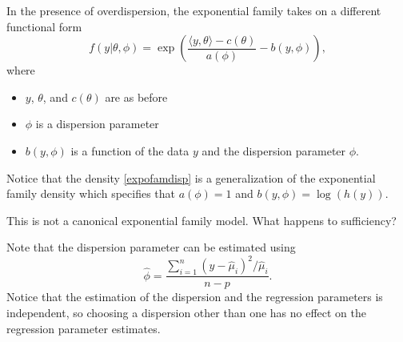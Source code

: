 \documentclass[
  ignorenonframetext,
]{beamer}
\providecommand{\tightlist}{%
  \setlength{\itemsep}{0pt}\setlength{\parskip}{0pt}}
\begin{document}
\begin{frame}{}
\protect\hypertarget{section}{}
In the presence of overdispersion, the exponential family takes on a
different functional form \begin{equation} \label{expofamdisp}
  f(y|\theta,\phi) = \exp\left(\frac{\langle y,\theta\rangle- c(\theta)}{a(\phi)} - b(y,\phi) \right),
\end{equation} where

\begin{itemize}
\tightlist
\item
  \(y\), \(\theta\), and \(c(\theta)\) are as before
\item
  \(\phi\) is a dispersion parameter
\item
  \(b(y,\phi)\) is a function of the data \(y\) and the dispersion
  parameter \(\phi\).
\end{itemize}

\vspace{12pt}

Notice that the density \eqref{expofamdisp} is a generalization of the
exponential family density which specifies that \(a(\phi) = 1\) and
\(b(y,\phi) = \log(h(y))\).

\vspace{12pt}

This is not a canonical exponential family model. What happens to
sufficiency?
\end{frame}

\begin{frame}{}
\protect\hypertarget{section-1}{}
Note that the dispersion parameter can be estimated using \[
  \hat{\phi} = \frac{\sum_{i=1}^n(y - \hat\mu_i)^2/\hat\mu_i}{n-p}.
\] Notice that the estimation of the dispersion and the regression
parameters is independent, so choosing a dispersion other than one has
no effect on the regression parameter estimates.
\end{frame}
\end{document}

